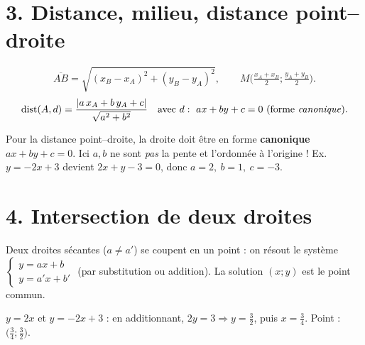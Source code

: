 \documentclass[11pt,a4paper]{article}
\begin{document}
\section*{3. Distance, milieu, distance point–droite}

\begin{idee}
\[ \overline{AB}=\sqrt{(x_B-x_A)^2+(y_B-y_A)^2}, \qquad M\Big(\tfrac{x_A+x_B}{2};\tfrac{y_A+y_B}{2}\Big). \]
\[ \operatorname{dist}(A,d)=\frac{\lvert a\,x_A+b\,y_A+c\rvert}{\sqrt{a^2+b^2}}\quad\text{avec } d:\ ax+by+c=0\ \text{(forme \emph{canonique})}. \]
\end{idee}

\begin{piege}
Pour la distance point–droite, la droite doit être en forme \textbf{canonique} $ax+by+c=0$. Ici $a,b$ ne sont \emph{pas} la pente et l'ordonnée à l'origine ! Ex. $y=-2x+3$ devient $2x+y-3=0$, donc $a=2,\ b=1,\ c=-3$.
\end{piege}

\section*{4. Intersection de deux droites}

Deux droites sécantes ($a\neq a'$) se coupent en un point : on résout le système
$\begin{cases} y=ax+b\\ y=a'x+b'\end{cases}$ (par substitution ou addition). La solution $(x;y)$ est le point commun.

\begin{exemple}
$y=2x$ et $y=-2x+3$ : en additionnant, $2y=3\Rightarrow y=\tfrac32$, puis $x=\tfrac34$. Point : $\big(\tfrac34;\tfrac32\big)$.
\end{exemple}
\end{document}
